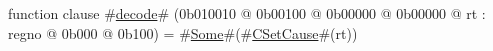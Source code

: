 function clause #\hyperref[zdecode]{decode}# (0b010010 @ 0b00100 @ 0b00000 @ 0b00000 @ rt : regno @ 0b000 @ 0b100) = #\hyperref[zSome]{Some}#(#\hyperref[zCSetCause]{CSetCause}#(rt))
